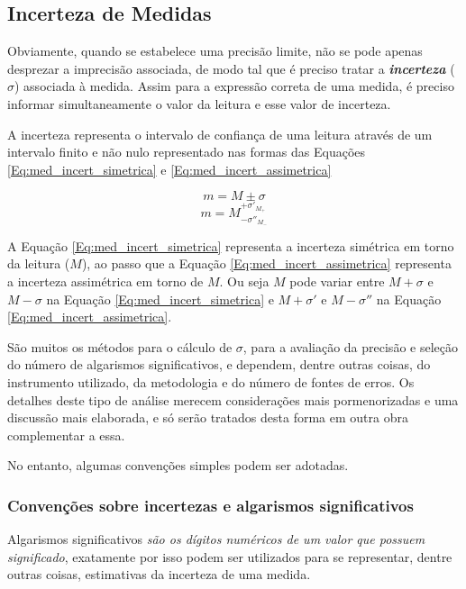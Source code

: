 \documentclass[a4paper, 11pt]{report}
\begin{document}
\subsection{Incerteza de Medidas}
Obviamente, quando se estabelece uma precisão limite, não se pode apenas
desprezar a imprecisão associada, de modo tal que é preciso tratar a 
\textbf{\emph{incerteza}} ($\sigma$) associada à medida. Assim para a expressão 
correta de uma medida, é preciso informar simultaneamente o valor da leitura e 
esse valor de incerteza. 

A incerteza representa o intervalo de confiança de uma leitura através de um 
intervalo finito e não nulo representado nas formas das Equações 
\ref{Eq:med_incert_simetrica} e \ref{Eq:med_incert_assimetrica}

\begin{equation}
    m = M \pm \sigma
    \label{Eq:med_incert_simetrica}
\end{equation}
\begin{equation}
    m = M^{+\sigma'_{M_+}}_{-\sigma''_{M_-}}
    \label{Eq:med_incert_assimetrica}
\end{equation}

A Equação \ref{Eq:med_incert_simetrica} representa a incerteza simétrica em 
torno da leitura ($M$), ao passo que a Equação \ref{Eq:med_incert_assimetrica}
representa a incerteza assimétrica em torno de $M$. Ou seja $M$ pode variar 
entre $M + \sigma$ e $M - \sigma$ na Equação \ref{Eq:med_incert_simetrica} e 
$M + \sigma'$ e $M - \sigma''$ na Equação \ref{Eq:med_incert_assimetrica}.

São muitos os métodos para o cálculo de $\sigma$, para a avaliação da precisão 
e seleção do número de algarismos significativos, e dependem, dentre outras 
coisas, do instrumento utilizado, da metodologia e do número de fontes de erros.
Os detalhes deste tipo de análise merecem considerações mais pormenorizadas e 
uma discussão mais elaborada, e só serão tratados desta forma em outra obra 
complementar a essa. 

No entanto, algumas convenções simples podem ser adotadas.

\subsubsection{Convenções sobre incertezas e algarismos significativos}
Algarismos significativos \emph{são os dígitos numéricos de um valor que 
possuem significado}, exatamente por isso podem ser utilizados para se 
representar, dentre outras coisas, estimativas da incerteza de uma medida.
\end{document}
